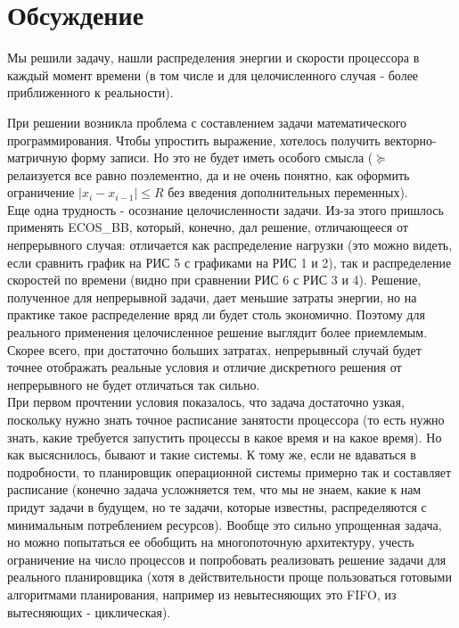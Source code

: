 \documentclass{article}
\begin{document}
\section{Обсуждение}

Мы решили задачу, нашли распределения энергии и скорости процессора в каждый момент времени (в том числе и для целочисленного случая - более приближенного к реальности).

При решении возникла проблема с составлением задачи математического программирования. Чтобы упростить выражение, хотелось получить векторно-матричную форму записи. Но это не будет иметь особого смысла ($\succeq$ релаизуется все равно поэлементно, да и не очень понятно, как оформить ограничение $|x_i-x_{i-1}| \le R$ без введения дополнительных переменных). \\

Еще одна трудность - осознание целочисленности задачи. Из-за этого пришлось применять ECOS\_BB, который, конечно, дал решение, отличающееся от непрерывного случая: отличается как распределение нагрузки (это можно видеть, если сравнить график на РИС 5 с графиками на РИС 1 и 2), так и распределение скоростей по времени (видно при сравнении РИС 6 с РИС 3 и 4). Решение, полученное для непрерывной задачи, дает меньшие затраты энергии, но на практике такое распределение вряд ли будет столь экономично. Поэтому для реального применения целочисленное решение выглядит более приемлемым. Скорее всего, при достаточно больших затратах, непрерывный случай будет точнее отображать реальные условия и отличие дискретного решения от непрерывного не будет отличаться так сильно. \\

При первом прочтении условия показалось, что задача достаточно узкая, поскольку нужно знать точное расписание занятости процессора (то есть нужно знать, какие требуется запустить процессы в какое время и на какое время). Но как высяснилось, бывают и такие системы. К тому же, если не вдаваться в подробности, то планировщик операционной системы примерно так и составляет расписание (конечно задача усложняется тем, что мы не знаем, какие к нам придут задачи в будущем, но те задачи, которые известны, распределяются с минимальным потреблением ресурсов). Вообще это сильно упрощенная задача, но можно попытаться ее обобщить на многопоточную архитектуру, учесть ограничение на число процессов и попробовать реализовать решение задачи для реального планировщика (хотя в действительности проще пользоваться готовыми алгоритмами планирования, например из невытесняющих это FIFO, из вытесняющих - циклическая).\\
\end{document}
